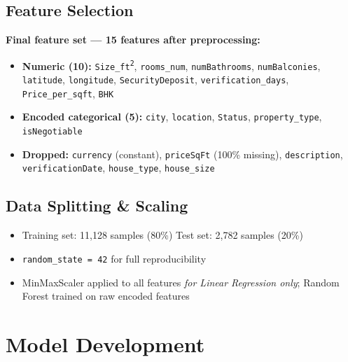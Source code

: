 \documentclass[12pt,a4paper]{article}
\begin{document}
\subsection{Feature Selection}
\textbf{Final feature set --- 15 features after preprocessing:}
\begin{itemize}
  \item \textbf{Numeric (10):} \texttt{Size\_ft\textsuperscript{2}}, \texttt{rooms\_num},
    \texttt{numBathrooms}, \texttt{numBalconies}, \texttt{latitude}, \texttt{longitude},
    \texttt{SecurityDeposit}, \texttt{verification\_days}, \texttt{Price\_per\_sqft},
    \texttt{BHK}
  \item \textbf{Encoded categorical (5):} \texttt{city}, \texttt{location},
    \texttt{Status}, \texttt{property\_type}, \texttt{isNegotiable}
  \item \textbf{Dropped:} \texttt{currency} (constant), \texttt{priceSqFt} (100\%
    missing), \texttt{description}, \texttt{verificationDate}, \texttt{house\_type},
    \texttt{house\_size}
\end{itemize}

\subsection{Data Splitting \& Scaling}
\begin{itemize}
  \item Training set: 11{,}128 samples (80\%) \quad Test set: 2{,}782 samples (20\%)
  \item \texttt{random\_state = 42} for full reproducibility
  \item MinMaxScaler applied to all features \emph{for Linear Regression only};
        Random Forest trained on raw encoded features
\end{itemize}

\section{Model Development}
\end{document}
